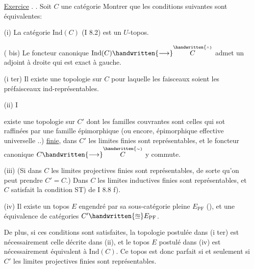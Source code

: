 \reversemarginpar
{}
\normalmarginpar

\uline{Exercice} . . Soit $C$ une  catégorie\handwritten{,} Montrer que les conditions suivantes sont équivalentes:

(i) La catégorie $\mathrm{Ind}(C)$ (I 8.2) est un \uline{$U$}-topos.

( bis) Le foncteur canonique $\mathrm{Ind}(C)\handwritten{\longrightarrow}\overset{\handwritten{\scriptscriptstyle\wedge}}{C}$ admet un adjoint à droite qui  est exact à gauche.

(i ter) Il existe une topologie sur $C$ pour laquelle les faisceaux soient les préfaisceaux ind-représentables.


(ii)  I existe une topologie sur $C'$ dont les familles couvrantes sont celles qui sot raffinées par une famille épimorphique (ou encore, épimorphique effective universelle ..) \uline{finie}, dans $C'$ les limites  finies sont représentables, et le foncteur canonique $C\handwritten{\longrightarrow}\overset{\handwritten{\scriptscriptstyle\sim}}{C}$  y commute.

(iii) (Si dans $C$ les limites projectives finies sont représentables, de sorte qu'on peut prendre $C'=C$.) Dans $C$ les limites inductives finies sont représentables, et $C$ satisfait la condition ST) de \reversemarginpar\margin{\handwritten{$\times$}}\normalmarginpar I 8.8 f).

(iv) Il existe un topos $E$ engendré par sa sous-catégorie pleine \reversemarginpar\margin{\handwritten{$\times$}}\normalmarginpar $E_{\mathrm{PF}}$ (\quad\quad), et une équivalence de catégories $C'\handwritten{\approxeq}E_{\mathrm{PF}}$.

De plus,  si ces conditions sont satisfaites, la topologie postulée dans (i ter) est nécessairement celle décrite dans (ii), et le topos $E$ postulé dans (iv) est nécessairement équivalent à $\mathrm{Ind}(C)$. Ce topos est donc parfait si et seulement si  $C'$  les limites projectives finies sont représentables.

